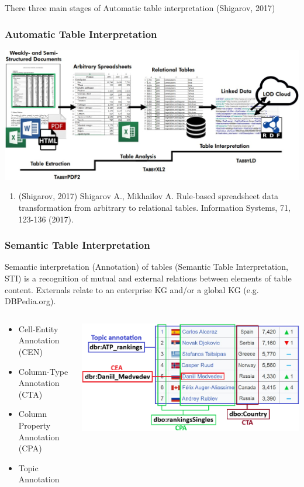 \documentclass[10pt]{beamer}
\begin{document}
\begin{frame}
  There three main stages of Automatic table interpretation (Shigarov, 2017)
  \frametitle{Automatic Table Interpretation}

  \includegraphics[width=\linewidth]{table-descr-proc.jpg}

{\footnotesize
\begin{enumerate}
\item (Shigarov, 2017) Shigarov A., Mikhailov A. Rule-based spreadsheet data transformation from arbitrary to relational tables. Information Systems, 71, 123-136 (2017).
\end{enumerate}
}
\end{frame}

\begin{frame}
  \frametitle{Semantic Table Interpretation}

Semantic interpretation (Annotation) of tables (Semantic Table Interpretation, STI) is a recognition of mutual and external relations between elements of table content.  Externals relate to an enterprise KG and/or a global KG (e.g. DBPedia.org).

  \begin{columns}
    \begin{column}{0.4\textwidth}
      \begin{itemize}
      \item Cell-Entity Annotation (CEN)
      \item Column-Type Annotation (CTA)
      \item Column Property Annotation (CPA)
      \item Topic Annotation
      \end{itemize}
    \end{column}
    \begin{column}{0.7\textwidth}
    \includegraphics[width=\linewidth]{table-sem-interp.png}
  \end{column}
\end{columns}
\end{frame}
\end{document}
